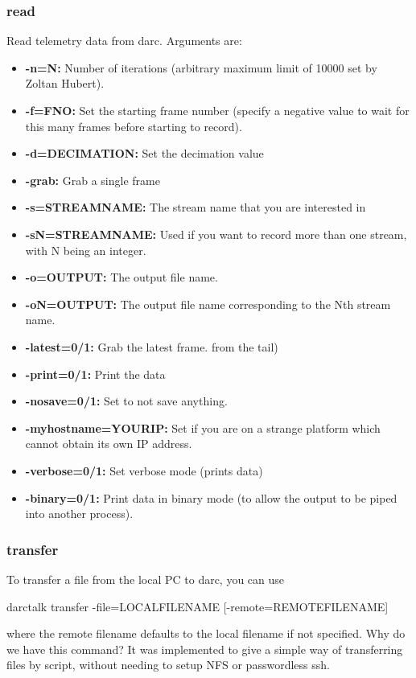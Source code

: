 \documentclass[a4,10pt]{article}
\begin{document}
{\subsubsection{read}
Read telemetry data from darc.  Arguments are:
\begin{itemize}
\item {\bf -n=N:} Number of iterations (arbitrary maximum limit of 10000 set
  by Zoltan Hubert).
\item {\bf -f=FNO:} Set the starting frame number (specify a negative value
  to wait for this many frames before starting to record).
\item {\bf -d=DECIMATION:} Set the decimation value
\item {\bf -grab:} Grab a single frame
\item {\bf -s=STREAMNAME:} The stream name that you are interested in
\item {\bf -sN=STREAMNAME:} Used if you want to record more than one stream,
  with N being an integer.
\item {\bf -o=OUTPUT:} The output file name.
\item {\bf -oN=OUTPUT:} The output file name corresponding to the Nth stream
  name.
\item {\bf -latest=0/1:} Grab the latest frame.
  from the tail)
\item {\bf -print=0/1:} Print the data
\item {\bf -nosave=0/1:} Set to not save anything.
\item {\bf -myhostname=YOURIP:} Set if you are on a strange platform which
  cannot obtain its own IP address.
\item {\bf -verbose=0/1:} Set verbose mode (prints data)
\item {\bf -binary=0/1:} Print data in binary mode (to allow the output to
  be piped into another process).
\end{itemize}

\subsubsection{transfer}
To transfer a file from the local PC to darc, you can use

darctalk transfer -file=LOCALFILENAME [-remote=REMOTEFILENAME]

where the remote filename defaults to the local filename if not
specified.  Why do we have this command?  It was implemented to give a
simple way of transferring files by script, without needing to setup
NFS or passwordless ssh.
}
\end{document}
